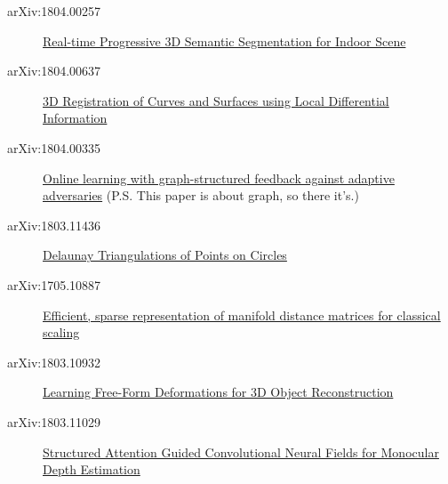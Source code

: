 \begin{description}
\item[arXiv:1804.00257] \href{https://arxiv.org/abs/1804.00257}{Real-time
    Progressive 3D Semantic Segmentation for Indoor Scene}
  
\item[arXiv:1804.00637] \href{https://arxiv.org/abs/1804.00637}{3D Registration
    of Curves and Surfaces using Local Differential Information}
  
\item[arXiv:1804.00335] \href{https://arxiv.org/abs/1804.00335}{Online learning
    with graph-structured feedback against adaptive adversaries} (P.S. This
  paper is about graph, so there it's.)
  
\item[arXiv:1803.11436] \href{https://arxiv.org/abs/1803.11436}{Delaunay
    Triangulations of Points on Circles}

\item[ arXiv:1705.10887] \href{https://arxiv.org/abs/1705.10887}{Efficient,
    sparse representation of manifold distance matrices for classical scaling}
  
\item[arXiv:1803.10932]\href{https://arxiv.org/abs/1803.10932}{Learning
    Free-Form Deformations for 3D Object Reconstruction}

\item[arXiv:1803.11029]\href{https://arxiv.org/abs/1803.11029}{Structured
    Attention Guided Convolutional Neural Fields for Monocular Depth Estimation}
    
\end{description}